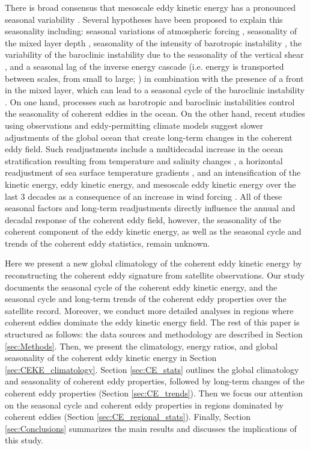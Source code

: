 \documentclass[draft,linenumbers]{agujournal2019}
\begin{document}
There is broad consensus that mesoscale eddy kinetic energy has a pronounced seasonal variability \citep{Qiu_seasonal_1999,Qiu_seasonal_2004,Kang_On_2017,Uchida_Seasonality_2017}. 
Several hypotheses have been proposed to explain this seasonality including: seasonal variations of atmospheric forcing \citep{Sasaki_seasonal_2014}, seasonality of the mixed layer depth \citep{Qiu_seasonal_2014,Callies_season_2015}, seasonality of the intensity of barotropic instability \citep{Qiu_seasonal_2004}, the variability of the baroclinic instability due to the seasonality of the vertical shear \citep{Qiu_seasonal_1999}, and a seasonal lag of the inverse energy cascade (i.e. energy is transported between scales, from small to large; \citealp{Arbic_cascade_2013}) in combination with the presence of a front in the mixed layer, which can lead to a seasonal cycle of the baroclinic instability \citep{Qiu_seasonal_2014}. On one hand, processes such as barotropic and baroclinic instabilities control the seasonality of coherent eddies in the ocean. 
On the other hand, recent studies using observations and eddy-permitting climate models suggest slower adjustments of the global ocean that create long-term changes in the coherent eddy field. 
Such readjustments include a multidecadal increase in the ocean stratification resulting from temperature and salinity changes \citep{Li_stratification_2020}, a horizontal readjustment of sea surface temperature gradients \citep{Cane_sst_trends_1997,Bouali_SST_grad_trends_2017,Ruela_SST_2020}, and an intensification of the kinetic energy, eddy kinetic energy, and mesoscale eddy kinetic energy over the last 3 decades as a consequence of an increase in wind forcing \citep{Hu_acceleration_2020,Wunsch_speeding_2020,Martinez_Kinetic_2021}. 
All of these seasonal factors and long-term readjustments directly influence the annual and decadal response of the coherent eddy field, however, the seasonality of the coherent component of the eddy kinetic energy, as well as the seasonal cycle and trends of the coherent eddy statistics, remain unknown.

Here we present a new global climatology of the coherent eddy kinetic energy by reconstructing the coherent eddy signature from satellite observations. Our study documents the seasonal cycle of the coherent eddy kinetic energy, and the seasonal cycle and long-term trends of the coherent eddy properties over the satellite record. 
Moreover, we conduct more detailed analyses in regions where coherent eddies dominate the eddy kinetic energy field. 
The rest of this paper is structured as follows:  the data sources and methodology are described in Section \ref{sec:Methods}.
Then, we present the climatology, energy ratios, and global seasonality of the coherent eddy kinetic energy in Section \ref{sec:CEKE_climatology}. 
Section \ref{sec:CE_stats} outlines the global climatology and seasonality of coherent eddy properties, followed by long-term changes of the coherent eddy properties (Section \ref{sec:CE_trends}). Then we focus our attention on the seasonal cycle and coherent eddy properties in regions dominated by coherent eddies (Section \ref{sec:CE_regional_stats}). 
Finally, Section \ref{sec:Conclusions} summarizes the main results and discusses the implications of this study.
\end{document}
